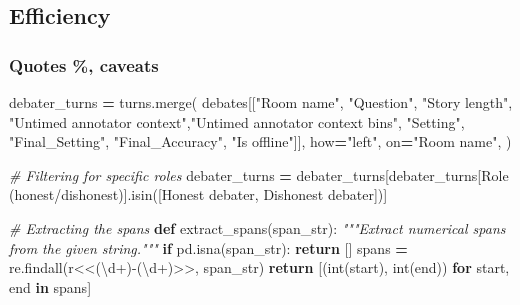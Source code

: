 \documentclass[
]{article}
\newenvironment{Shaded}{\begin{snugshade}}{\end{snugshade}}
\newcommand{\BuiltInTok}[1]{#1}
\newcommand{\CommentTok}[1]{\textcolor[rgb]{0.56,0.35,0.01}{\textit{#1}}}
\newcommand{\ControlFlowTok}[1]{\textcolor[rgb]{0.13,0.29,0.53}{\textbf{#1}}}
\newcommand{\KeywordTok}[1]{\textcolor[rgb]{0.13,0.29,0.53}{\textbf{#1}}}
\newcommand{\NormalTok}[1]{#1}
\newcommand{\OperatorTok}[1]{\textcolor[rgb]{0.81,0.36,0.00}{\textbf{#1}}}
\newcommand{\StringTok}[1]{\textcolor[rgb]{0.31,0.60,0.02}{#1}}
\newcommand{\VerbatimStringTok}[1]{\textcolor[rgb]{0.31,0.60,0.02}{#1}}
\begin{document}
\subsection{Efficiency}\label{efficiency}

\subsubsection{Quotes \%, caveats}\label{quotes-caveats}

\begin{Shaded}
\begin{Highlighting}[]
\NormalTok{debater\_turns }\OperatorTok{=}\NormalTok{ turns.merge(}
\NormalTok{        debates[[}\StringTok{"Room name"}\NormalTok{, }\StringTok{"Question"}\NormalTok{, }\StringTok{"Story length"}\NormalTok{,}
                 \StringTok{"Untimed annotator context"}\NormalTok{,}\StringTok{"Untimed annotator context bins"}\NormalTok{,}
                 \StringTok{"Setting"}\NormalTok{, }\StringTok{"Final\_Setting"}\NormalTok{, }\StringTok{"Final\_Accuracy"}\NormalTok{,}
                 \StringTok{"Is offline"}\NormalTok{]],}
\NormalTok{        how}\OperatorTok{=}\StringTok{"left"}\NormalTok{,}
\NormalTok{        on}\OperatorTok{=}\StringTok{"Room name"}\NormalTok{,}
\NormalTok{    )}



\CommentTok{\# Filtering for specific roles}
\NormalTok{debater\_turns }\OperatorTok{=}\NormalTok{ debater\_turns[debater\_turns[}\StringTok{\textquotesingle{}Role (honest/dishonest)\textquotesingle{}}\NormalTok{].isin([}\StringTok{\textquotesingle{}Honest debater\textquotesingle{}}\NormalTok{, }\StringTok{\textquotesingle{}Dishonest debater\textquotesingle{}}\NormalTok{])]}

\CommentTok{\# Extracting the spans}
\KeywordTok{def}\NormalTok{ extract\_spans(span\_str):}
    \CommentTok{"""Extract numerical spans from the given string."""}
    \ControlFlowTok{if}\NormalTok{ pd.isna(span\_str):}
        \ControlFlowTok{return}\NormalTok{ []}
\NormalTok{    spans }\OperatorTok{=}\NormalTok{ re.findall(}\VerbatimStringTok{r\textquotesingle{}\textless{}\textless{}(\textbackslash{}d+){-}(\textbackslash{}d+)\textgreater{}\textgreater{}\textquotesingle{}}\NormalTok{, span\_str)}
    \ControlFlowTok{return}\NormalTok{ [(}\BuiltInTok{int}\NormalTok{(start), }\BuiltInTok{int}\NormalTok{(end)) }\ControlFlowTok{for}\NormalTok{ start, end }\KeywordTok{in}\NormalTok{ spans]}


\end{Highlighting}
\end{Shaded}
\end{document}
